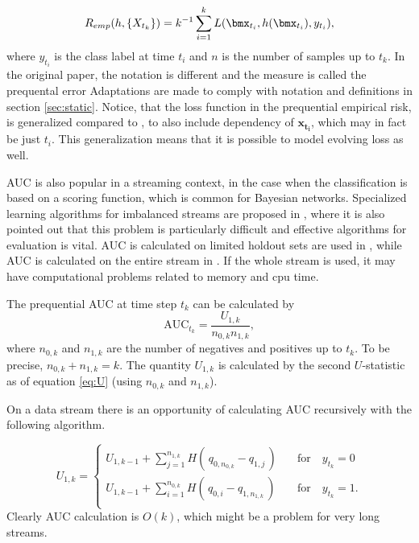 \begin{equation}
\label{eq:prequentialRisk}
R_{emp}(h, \{X_{t_k}\}) = k^{-1} \sum_{i=1}^k L(\bmx_{t_i} , h(\bmx_{t_i} ), y_{t_i}),
\end{equation}
where $y_{t_i}$ is the class label at time $t_i$ and $n$ is the number of samples up to $t_k$.  In the original paper, the notation is different and the measure is called the prequental error  Adaptations are made to comply with notation and definitions in section \ref{sec:static}.  Notice, that the loss function in the prequential empirical risk, is generalized compared to \cite{Gam13}, to also include dependency of $\bm{x_{t_i}}$, which may in fact be just $t_i$.  This generalization means that it is possible to model evolving loss as well.


AUC is also popular in a streaming context, in the case when the classification is based on a scoring function, which is common for Bayesian networks. 
Specialized learning algorithms for imbalanced streams are proposed in \cite{Dit13, Hoe12, Lic10}, where it is also pointed out that this problem is particularly difficult and effective algorithms for evaluation is vital.  
AUC is calculated on limited holdout sets are used in  \cite{Dit13, Lic10}, while AUC is calculated on the entire stream in  \cite{Hoe12}. If the whole stream is used, it may have computational problems related to memory and cpu time.  

The prequential AUC at time step $t_k$ can be calculated by
\begin{equation}
\label{eq:prequentialAUC}
\mbox{AUC}_{t_k}= \frac{U_{1,k}}{n_{0,k}n_{1,k}},
\end{equation}
where $n_{0,k}$ and $n_{1,k}$ are the number of negatives and positives up to $t_k$.  To be precise, $n_{0,k} + n_{1,k} = k$.  The quantity $U_{1,k}$ is calculated by the second $U$-statistic as of equation \eqref{eq:U} (using $n_{0,k}$ and $n_{1,k}$).

On a data stream there is an opportunity of calculating AUC recursively with the following algorithm.

\begin{equation}
\label{eq:prequentialAUC2}
U_{1,k}= 
\begin{cases}
U_{1,k-1} + \sum_{j=1}^{n_{1,k}} H( \,q_{0,n_{0,k}} - q_{1,j}    \,)
 \quad &\mbox{for} \quad y_{t_k} = 0\\
U_{1,k-1} + \sum_{i=1}^{n_{0,k}} H( \,q_{0,i} - q_{1,n_{1,k}}    \,)
\quad &\mbox{for} \quad y_{t_k} = 1.\\
\end{cases}
\end{equation}
Clearly AUC calculation is $O(k)$, which might be a problem for very long streams.  

